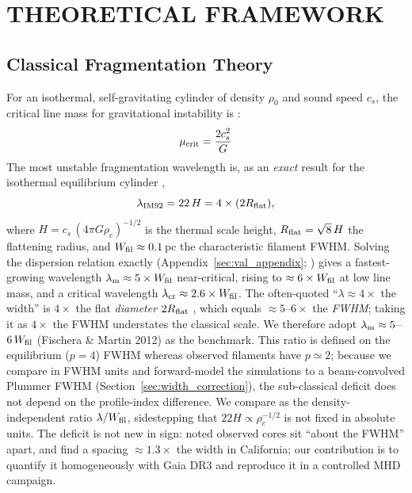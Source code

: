 \documentclass[usenatbib,twoside,twocolumn]{mnras}
\begin{document}
\section{THEORETICAL FRAMEWORK}
\label{sec:theory}

\subsection{Classical Fragmentation Theory}

For an isothermal, self-gravitating cylinder of density $\rho_0$ and sound speed $c_s$, the critical line mass for gravitational instability is \citep{Ostriker1964}:
\begin{equation}
\mu_{\rm crit} = \frac{2c_s^2}{G}
\end{equation}
The most unstable fragmentation wavelength is, as an \emph{exact} result for the isothermal equilibrium cylinder \citep{Inutsuka1992},
\begin{equation}
\lambda_{\rm IM92} = 22\,H = 4\times(2R_{\rm flat}),
\label{eq:im92}
\end{equation}
where $H = c_s\,(4\pi G\rho_c)^{-1/2}$ is the thermal scale height, $R_{\rm flat}=\sqrt8\,H$ the flattening radius, and $W_{\rm fil}\approx0.1$\,pc the characteristic filament FWHM. Solving the dispersion relation exactly (Appendix~\ref{sec:val_appendix}; \citealt{Fischera2012}) gives a fastest-growing wavelength $\lambda_{\rm m}\approx5\times W_{\rm fil}$ near-critical, rising to $\approx6\times W_{\rm fil}$ at low line mass, and a critical wavelength $\lambda_{\rm cr}\approx2.6\times W_{\rm fil}$. The often-quoted ``$\lambda\approx4\times$ the width'' is $4\times$ the flat \emph{diameter} $2R_{\rm flat}$ \citep{Inutsuka1992}, which equals $\approx5$--$6\times$ the \emph{FWHM}; taking it as $4\times$ the FWHM understates the classical scale. We therefore adopt $\lambda_{\rm m}\approx5$--$6\,W_{\rm fil}$ (Fischera \& Martin 2012) as the benchmark. This ratio is defined on the equilibrium ($p=4$) FWHM whereas observed filaments have $p\simeq2$; because we compare in FWHM units and forward-model the simulations to a beam-convolved Plummer FWHM (Section~\ref{sec:width_correction}), the sub-classical deficit does not depend on the profile-index difference. We compare as the density-independent ratio $\lambda/W_{\rm fil}$, sidestepping that $22H\propto\rho_c^{-1/2}$ is not fixed in absolute units. The deficit is not new in sign: \citet{Fischera2012} noted observed cores sit ``about the FWHM'' apart, and \citet{Zhang2023cal} find a spacing $\approx1.3\times$ the width in California; our contribution is to quantify it homogeneously with Gaia DR3 and reproduce it in a controlled MHD campaign.
\end{document}

